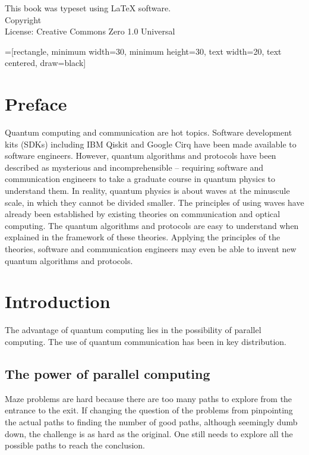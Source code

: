 \documentclass{book}
\makeatletter
\newcommand{\booklicense}{Creative Commons Zero 1.0 Universal}
\newcommand{\bookauthor}{\@author}
\makeatother
\begin{document}
\begin{flushleft}
\vspace*{\fill}
This book was typeset using \LaTeX{} software.\\
\vspace{\fill}
Copyright \textcopyright{} \the\year{}  \bookauthor\\
License: \booklicense
\end{flushleft}

\addtocounter{page}{2}

=[rectangle, minimum width=30, minimum height=30, text width=20, text centered, draw=black]

\chapter*{Preface}
Quantum computing and communication are hot topics. Software development kits (SDKs) including IBM Qiskit and Google Cirq have been made available to software engineers. However, quantum algorithms and protocols have been described as mysterious and incomprehensible -- requiring software and communication engineers to take a graduate course in quantum physics to understand them. In reality, quantum physics is about waves at the minuscule scale, in which they cannot be divided smaller. The principles of using waves have already been established by existing theories on communication and optical computing. The quantum algorithms and protocols are easy to understand when explained in the framework of these theories. Applying the principles of the theories, software and communication engineers may even be able to invent new quantum algorithms and protocols.

\setcounter{tocdepth}{3}
\tableofcontents

\mainmatter

\chapter{Introduction}
The advantage of quantum computing lies in the possibility of parallel computing. The use of quantum communication has been in key distribution.

\section{The power of parallel computing}
Maze problems are hard because there are too many paths to explore from the entrance to the exit. If changing the question of the problems from pinpointing the actual paths to finding the number of good paths, although seemingly dumb down, the challenge is as hard as the original. One still needs to explore all the possible paths to reach the conclusion.
\end{document}
